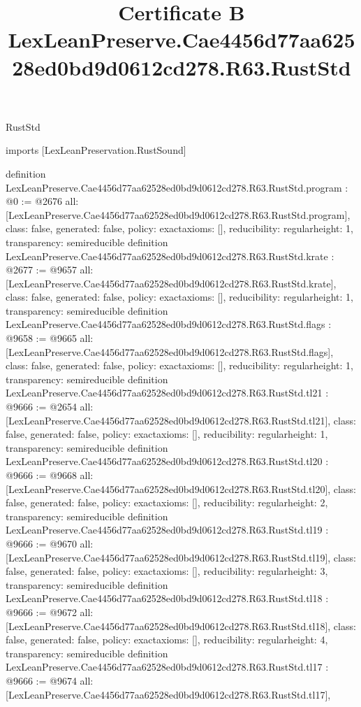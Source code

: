 \begin{lexlean}{RustStd}
\title{Certificate B LexLeanPreserve.Cae4456d77aa62528ed0bd9d0612cd278.R63.RustStd}
\begin{coremodule}
imports [LexLeanPreservation.RustSound]

definition LexLeanPreserve.Cae4456d77aa62528ed0bd9d0612cd278.R63.RustStd.program : @0 := @2676 {
  all: [LexLeanPreserve.Cae4456d77aa62528ed0bd9d0612cd278.R63.RustStd.program],
  class: false,
  generated: false,
  policy: exact{axioms: []},
  reducibility: regular{height: 1},
  transparency: semireducible
}
definition LexLeanPreserve.Cae4456d77aa62528ed0bd9d0612cd278.R63.RustStd.krate : @2677 := @9657 {
  all: [LexLeanPreserve.Cae4456d77aa62528ed0bd9d0612cd278.R63.RustStd.krate],
  class: false,
  generated: false,
  policy: exact{axioms: []},
  reducibility: regular{height: 1},
  transparency: semireducible
}
definition LexLeanPreserve.Cae4456d77aa62528ed0bd9d0612cd278.R63.RustStd.flags : @9658 := @9665 {
  all: [LexLeanPreserve.Cae4456d77aa62528ed0bd9d0612cd278.R63.RustStd.flags],
  class: false,
  generated: false,
  policy: exact{axioms: []},
  reducibility: regular{height: 1},
  transparency: semireducible
}
definition LexLeanPreserve.Cae4456d77aa62528ed0bd9d0612cd278.R63.RustStd.tl21 : @9666 := @2654 {
  all: [LexLeanPreserve.Cae4456d77aa62528ed0bd9d0612cd278.R63.RustStd.tl21],
  class: false,
  generated: false,
  policy: exact{axioms: []},
  reducibility: regular{height: 1},
  transparency: semireducible
}
definition LexLeanPreserve.Cae4456d77aa62528ed0bd9d0612cd278.R63.RustStd.tl20 : @9666 := @9668 {
  all: [LexLeanPreserve.Cae4456d77aa62528ed0bd9d0612cd278.R63.RustStd.tl20],
  class: false,
  generated: false,
  policy: exact{axioms: []},
  reducibility: regular{height: 2},
  transparency: semireducible
}
definition LexLeanPreserve.Cae4456d77aa62528ed0bd9d0612cd278.R63.RustStd.tl19 : @9666 := @9670 {
  all: [LexLeanPreserve.Cae4456d77aa62528ed0bd9d0612cd278.R63.RustStd.tl19],
  class: false,
  generated: false,
  policy: exact{axioms: []},
  reducibility: regular{height: 3},
  transparency: semireducible
}
definition LexLeanPreserve.Cae4456d77aa62528ed0bd9d0612cd278.R63.RustStd.tl18 : @9666 := @9672 {
  all: [LexLeanPreserve.Cae4456d77aa62528ed0bd9d0612cd278.R63.RustStd.tl18],
  class: false,
  generated: false,
  policy: exact{axioms: []},
  reducibility: regular{height: 4},
  transparency: semireducible
}
definition LexLeanPreserve.Cae4456d77aa62528ed0bd9d0612cd278.R63.RustStd.tl17 : @9666 := @9674 {
  all: [LexLeanPreserve.Cae4456d77aa62528ed0bd9d0612cd278.R63.RustStd.tl17],
}
\end{coremodule}
\end{lexlean}
